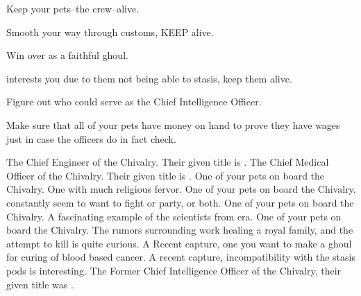 \documentclass[char]{guildcamp4}
\begin{document}
 

\begin{itemz}[Goals]
	\item Keep your pets--the crew--alive.
	\item Smooth your way through customs, KEEP \cCbad{} alive.
	\item Win over \cSpite{} as a faithful ghoul.
	\item \cPlead{} interests you due to them not being able to stasis, keep them alive. 
	\item Figure out who could serve as the Chief Intelligence Officer.
	\item Make sure that all of your pets have money on hand to prove they have wages just in case the officers do in fact check.

\end{itemz}

\begin{contacts}
	\contact{\cVtwo{}} The Chief Engineer of the Chivalry. Their given title is \cVtwo{\Marq}.
	\contact{\cVthree{}} The Chief Medical Officer of the Chivalry. Their given title is \cVtwo{\Baron}.
	\contact{\cJoan{}} One of your pets on board the Chivalry. One with much religious fervor.
	\contact{\cJulie{}} One of your pets on board the Chivalry. \cJulie{\they} constantly seem to want to fight or party, or both.
	\contact{\cJames{}} One of your pets on board the Chivalry. A fascinating example of the scientists from \cJames{\their} era.
	\contact{\cRasputin{}} One of your pets on board the Chivalry. The rumors surrounding \cRasputin{\their} work healing a royal family, and the attempt to kill \cRasputin{\them} is quite curious.
	\contact{\cSpite{}} A Recent capture, one you want to make a ghoul for \cSpite{\their} curing of blood based cancer.
	\contact{\cPlead{}} A recent capture,  incompatibility with the stasis pods is interesting.
	\contact{\cIntel{}} The Former Chief Intelligence Officer of the Chivalry, their given title was \cIntel{\Count}.
\end{contacts}
\end{document}
